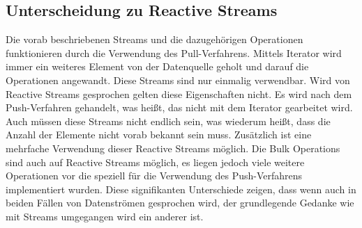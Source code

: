 \subsection{Unterscheidung zu Reactive Streams}
Die vorab beschriebenen Streams und die dazugehörigen Operationen funktionieren durch die Verwendung des Pull-Verfahrens. Mittels Iterator wird immer ein weiteres Element von der Datenquelle geholt und darauf die Operationen angewandt. Diese Streams sind nur einmalig verwendbar. Wird von Reactive Streams gesprochen gelten diese Eigenschaften nicht. Es wird nach dem Push-Verfahren gehandelt, was heißt, das nicht mit dem Iterator gearbeitet wird. Auch müssen diese Streams nicht endlich sein, was wiederum heißt, dass die Anzahl der Elemente nicht vorab bekannt sein muss. Zusätzlich ist eine mehrfache Verwendung dieser Reactive Streams möglich. Die Bulk Operations sind auch auf Reactive Streams möglich, es liegen jedoch viele weitere Operationen vor die speziell für die Verwendung des Push-Verfahrens implementiert wurden. Diese signifikanten Unterschiede zeigen, dass wenn auch in beiden Fällen von Datenströmen gesprochen wird, der grundlegende Gedanke wie mit Streams umgegangen wird ein anderer ist.
